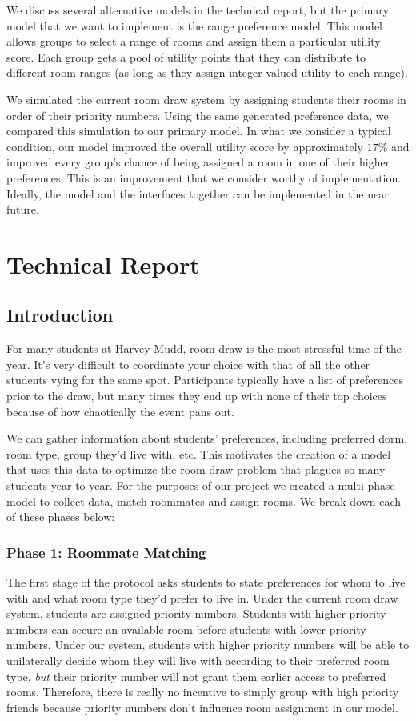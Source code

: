 \documentclass[12pt]{article}
\begin{document}
    We discuss several alternative models in the technical report, but the primary model that we want to implement is the range preference model. This model allows groups to select a range of rooms and assign them a particular utility score. Each group gets a pool of utility points that they can distribute to different room ranges (as long as they assign integer-valued utility to each range). 
    
    We simulated the current room draw system by assigning students their rooms in order of their priority numbers. Using the same generated preference data, we compared this simulation to our primary model. In what we consider a typical condition, our model improved the overall utility score by approximately $17\%$ and improved every group's chance of being assigned a room in one of their higher preferences. This is an improvement that we consider worthy of implementation. Ideally, the model and the interfaces together can be implemented in the near future. 
    
    \section*{Technical Report}
    \subsection*{Introduction}
    For many students at Harvey Mudd, room draw is the most stressful time of the year. It's very difficult to coordinate your choice with that of all the other students vying for the same spot. Participants typically have a list of preferences prior to the draw, but many times they end up with none of their top choices because of how chaotically the event pans out. 
    
    We can gather information about students' preferences, including preferred dorm, room type, group they'd live with, etc. This motivates the creation of a model that uses this data to optimize the room draw problem that plagues so many students year to year. For the purposes of our project we created a multi-phase model to collect data, match roommates and assign rooms. We break down each of these phases below: 

        \subsubsection*{Phase 1: Roommate Matching}
    The first stage of the protocol asks students to state preferences for whom to live with and what room type they'd prefer to live in. Under the current room draw system, students are assigned priority numbers. Students with higher priority numbers can secure an available room before students with lower priority numbers. Under our system, students with higher priority numbers will be able to unilaterally decide whom they will live with according to their preferred room type, \textit{but} their priority number will not grant them earlier access to preferred rooms. Therefore, there is really no incentive to simply group with high priority friends because priority numbers don't influence room assignment in our model.
    
\end{document}
